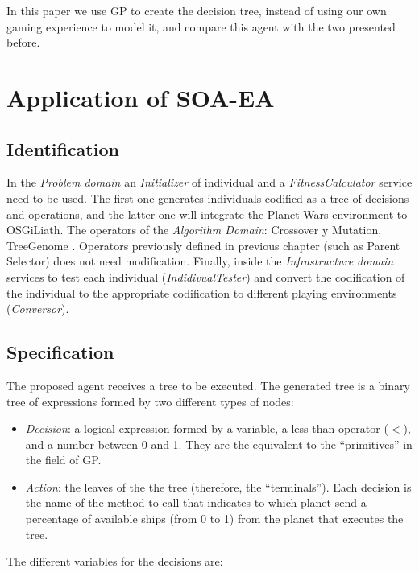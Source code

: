 In this paper we use GP to create the decision tree,
instead of using our own gaming experience to model it, and compare
this agent with the two presented before.  


\section{Application of SOA-EA}

\subsection{Identification}

In the {\em Problem domain} an {\em Initializer} of individual and a {\em FitnessCalculator} service need to be used. The first one generates individuals codified as a tree of decisions and operations, and the latter one will integrate the Planet Wars environment to OSGiLiath.
The operators of the {\em Algorithm Domain}: Crossover y Mutation, TreeGenome . Operators previously defined in previous chapter (such as Parent Selector) does not need modification.
Finally, inside the {\em Infrastructure domain} services to test each individual ({\em IndidivualTester}) and convert the codification of the individual to the appropriate codification to different playing environments ({\em Conversor}).

\subsection{Specification}

The proposed agent receives a tree to be executed. The generated tree
is a binary tree of expressions formed by two different types of nodes:

\begin{itemize}
\item {\em Decision}: a logical expression formed by a variable, a less than operator ($<$), and a number between 0 and 1. They are the equivalent to the ``primitives'' in the field of GP.
\item {\em Action}: the leaves of the the tree (therefore, the ``terminals''). Each decision is the name of the method to call that indicates to which planet send a percentage of available ships (from 0 to 1) from the planet that executes the tree. 
\end{itemize}

The different variables for the decisions are:

